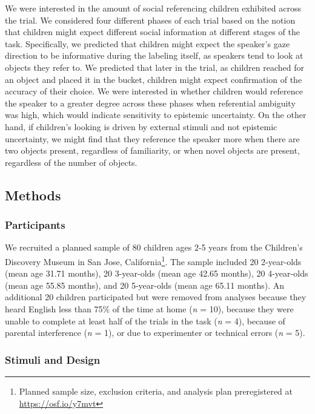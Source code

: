 \documentclass[10pt, letterpaper]{article}
\begin{document}
We were interested in the amount of social referencing children
exhibited across the trial. We considered four different phases of each
trial based on the notion that children might expect different social
information at different stages of the task. Specifically, we predicted
that children might expect the speaker's gaze direction to be
informative during the labeling itself, as speakers tend to look at
objects they refer to. We predicted that later in the trial, as children
reached for an object and placed it in the bucket, children might expect
confirmation of the accuracy of their choice. We were interested in
whether children would reference the speaker to a greater degree across
these phases when referential ambiguity was high, which would indicate
sensitivity to epistemic uncertainty. On the other hand, if children's
looking is driven by external stimuli and not epistemic uncertainty, we
might find that they reference the speaker more when there are two
objects present, regardless of familiarity, or when novel objects are
present, regardless of the number of objects.

\subsection{Methods}\label{methods}

\subsubsection{Participants}\label{participants}

We recruited a planned sample of 80 children ages 2-5 years from the
Children's Discovery Museum in San Jose, California\footnote{Planned
  sample size, exclusion criteria, and analysis plan preregistered at
  \url{https://osf.io/y7mvt}}. The sample included 20 2-year-olds (mean
age 31.71 months), 20 3-year-olds (mean age 42.65 months), 20
4-year-olds (mean age 55.85 months), and 20 5-year-olds (mean age 65.11
months). An additional 20 children participated but were removed from
analyses because they heard English less than 75\% of the time at home
(\emph{n} = 10), because they were unable to complete at least half of
the trials in the task (\emph{n} = 4), because of parental interference
(\emph{n} = 1), or due to experimenter or technical errors (\emph{n} =
5).

\subsubsection{Stimuli and Design}\label{stimuli-and-design}
\end{document}
